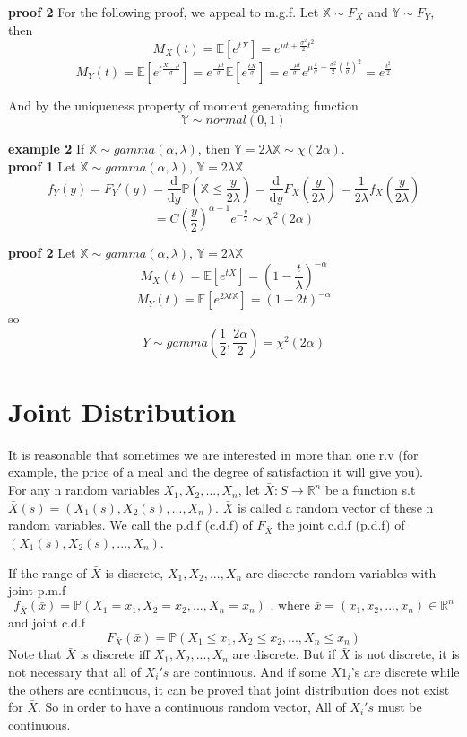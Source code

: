 \documentclass[a4paper,12pt]{article}
\begin{document}
\textbf{proof 2} For the following proof, we appeal to m.g.f. Let $\mathbb{X} \sim F_X$ and $\mathbb{Y} \sim F_Y$, then
$$M_X(t) = \mathbb{E}[e^{tX}] = e^{\mu t + \frac{\sigma^2}{2}t^2}$$
$$M_Y(t) = \mathbb{E}[e^{t\frac{X-\mu}{\sigma}}] = e^\frac{-\mu t}{\sigma} \mathbb{E}[ e^\frac{tX}{\sigma}] = 
e^\frac{-\mu t}{\sigma}e^{\mu \frac{t}{\sigma} + \frac{\sigma^2}{2}(\frac{t}{\sigma})^2} = e^\frac{t^2}{2}$$

And by the uniqueness property of moment generating function
$$\mathbb{Y} \sim normal(0, 1)$$

\textbf{example 2}
If $\mathbb{X} \sim gamma(\alpha, \lambda)$, then $\mathbb{Y} = 2 \lambda \mathbb{X} \sim \chi(2 \alpha)$.\\

\textbf{proof 1}
Let $\mathbb{X} \sim gamma(\alpha, \lambda)$,  $\mathbb{Y} = 2 \lambda \mathbb{X}$
$$f_Y(y) = F_Y'(y) = \frac{\mathrm{d}}{\mathrm{d}y} \mathbb{P}( \mathbb{X} \leq \frac{y}{2 \lambda} ) = \frac{\mathrm{d}}{\mathrm{d}y} F_X( \frac{y}{2 \lambda} ) = \frac{1}{2 \lambda} f_X( \frac{y}{2 \lambda} )$$
$$= C (\frac{y}{2})^{\alpha-1} e^{-\frac{y}{2}} \sim \chi^2(2\alpha)$$

\textbf{proof 2}
Let $\mathbb{X} \sim gamma(\alpha, \lambda)$,  $\mathbb{Y} = 2 \lambda \mathbb{X}$
$$M_X(t) = \mathbb{E}[e^{tX}] = (1-\frac{t}{\lambda} )^{-\alpha}$$
$$M_Y(t) = \mathbb{E}[e^{2 \lambda t \mathbb{X}}] = (1-2 t)^{-\alpha}$$
so
$$Y \sim gamma(\frac{1}{2}, \frac{2\alpha}{2}) = \chi^2(2\alpha)$$


\newpage
\section{Joint Distribution}
It is reasonable that sometimes we are interested in more than one r.v (for example, the price of a meal and the degree of satisfaction it will give you).\\

For any n random variables $X_1, X_2, ..., X_n$, let $\bar{X} : S \to \mathbb{R}^n$ be a function s.t $\bar{X}(s) = (X_1(s), X_2(s), ..., X_n)$.  $\bar{X}$ is called a random vector of these n random variables. We call the p.d.f (c.d.f) of $F_{\bar{X}}$ the joint c.d.f (p.d.f) of $(X_1(s), X_2(s), ..., X_n)$.

If the range of $\bar{X}$ is discrete, $X_1, X_2, ..., X_n$ are discrete random variables with joint p.m.f
$$f_{\bar{X}}(\bar{x}) = \mathbb{P}( X_1 = x_1, X_2 = x_2, ..., X_n = x_n )\text{ , where }\bar{x} = (x_1, x_2, ..., x_n) \in \mathbb{R}^n $$
and joint c.d.f
$$F_{\bar{X}}(\bar{x}) = \mathbb{P}( X_1 \leq x_1, X_2 \leq x_2, ..., X_n \leq x_n )$$
Note that $\bar{X}$ is discrete iff $X_1, X_2, ..., X_n$ are discrete. But if $\bar{X}$ is not discrete, it is not necessary that all of $X_i's$ are continuous. And if some $X1_i$'s are discrete while the others are continuous, it can be proved that joint distribution does not exist for $\bar{X}$. So in order to have a continuous random vector, All of $X_i's$ must be continuous.
\end{document}
